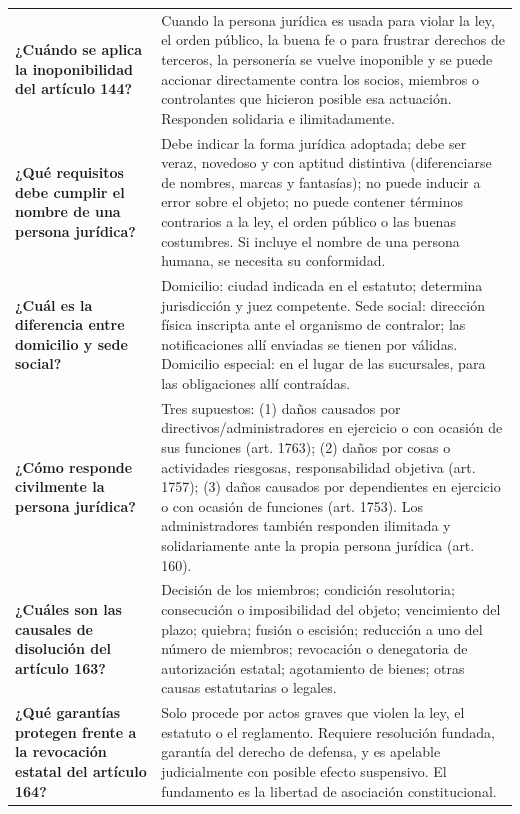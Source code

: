 \documentclass[12pt,oneside]{book}
\begin{document}
\begin{longtable}{
    >{\raggedright\arraybackslash}p{}
    >{\raggedright\arraybackslash}X
}
\textbf{¿Cuándo se aplica la inoponibilidad del artículo 144?} &
Cuando la persona jurídica es usada para violar la ley, el orden público, la buena fe o para frustrar derechos de terceros, la personería se vuelve inoponible y se puede accionar directamente contra los socios, miembros o controlantes que hicieron posible esa actuación. Responden solidaria e ilimitadamente. \\[0.4em]

\textbf{¿Qué requisitos debe cumplir el nombre de una persona jurídica?} &
Debe indicar la forma jurídica adoptada; debe ser veraz, novedoso y con aptitud distintiva (diferenciarse de nombres, marcas y fantasías); no puede inducir a error sobre el objeto; no puede contener términos contrarios a la ley, el orden público o las buenas costumbres. Si incluye el nombre de una persona humana, se necesita su conformidad. \\[0.4em]

\textbf{¿Cuál es la diferencia entre domicilio y sede social?} &
Domicilio: ciudad indicada en el estatuto; determina jurisdicción y juez competente. Sede social: dirección física inscripta ante el organismo de contralor; las notificaciones allí enviadas se tienen por válidas. Domicilio especial: en el lugar de las sucursales, para las obligaciones allí contraídas. \\[0.4em]

\textbf{¿Cómo responde civilmente la persona jurídica?} &
Tres supuestos: (1) daños causados por directivos/administradores en ejercicio o con ocasión de sus funciones (art. 1763); (2) daños por cosas o actividades riesgosas, responsabilidad objetiva (art. 1757); (3) daños causados por dependientes en ejercicio o con ocasión de funciones (art. 1753). Los administradores también responden ilimitada y solidariamente ante la propia persona jurídica (art. 160). \\[0.4em]

\textbf{¿Cuáles son las causales de disolución del artículo 163?} &
Decisión de los miembros; condición resolutoria; consecución o imposibilidad del objeto; vencimiento del plazo; quiebra; fusión o escisión; reducción a uno del número de miembros; revocación o denegatoria de autorización estatal; agotamiento de bienes; otras causas estatutarias o legales. \\[0.4em]

\textbf{¿Qué garantías protegen frente a la revocación estatal del artículo 164?} &
Solo procede por actos graves que violen la ley, el estatuto o el reglamento. Requiere resolución fundada, garantía del derecho de defensa, y es apelable judicialmente con posible efecto suspensivo. El fundamento es la libertad de asociación constitucional. \\[0.4em]


\end{longtable}
\end{document}
